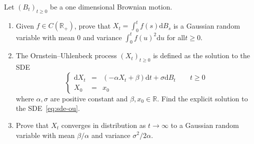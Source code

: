 \documentclass{article}
\newcommand{\mathd}{\mathrm{d}}
\newenvironment{enumeratealpha}{\begin{enumerate}[a{\textup{)}}] }{\end{enumerate}}
{\theorembodyfont{\rmfamily\small}\newtheorem{exercise}{Exercise}}
\begin{document}
\begin{exercise}
  [Pts 2+2+2] Let $(B_t)_{t \geqslant 0}$ be a one dimensional Brownian
  motion.
  \begin{enumeratealpha}
    \item Given $f \in C (\mathbb{R}_+)$, prove that $X_t = \int_0^t f (s)
    \mathd B_s$ is a Gaussian random variable with mean $0$ and variance
    $\int_0^t f (u)^2 \mathd u$ for all\quad$t \geqslant 0$.
    
    \item The Ornstein--Uhlenbeck process $(X_t)_{t \geqslant 0}$ is defined
    as the solution to the SDE
    \begin{equation}
      \left\{\begin{array}{lll}
        \mathd X_t & = & (- \alpha X_t + \beta) \mathd t + \sigma \mathd B_t
        \qquad t \geqslant 0\\
        X_0 & = & x_0
      \end{array}\right. \label{eq:sde-ou}
    \end{equation}
    where $\alpha, \sigma$ are positive constant and $\beta, x_0 \in
    \mathbb{R}$. Find the explicit solution to the SDE~{\eqref{eq:sde-ou}}.
    
    \item Prove that $X_t$ converges in distribution as $t \rightarrow \infty$
    to a Gaussian random variable with mean $\beta / \alpha$ and variance
    $\sigma^2 / 2 \alpha$.
  \end{enumeratealpha}
\end{exercise}

\
\end{document}
